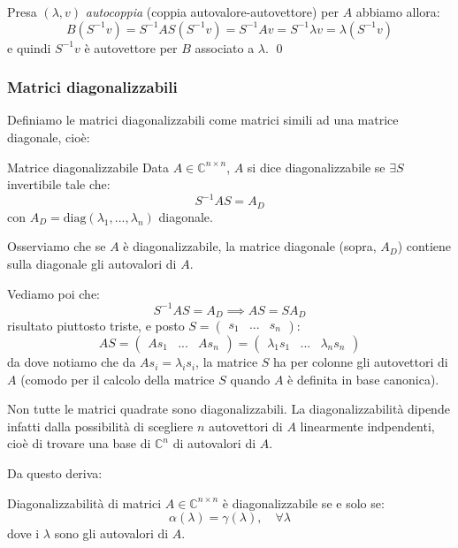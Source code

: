 \documentclass[a4paper,11pt]{article}
\begin{document}
Presa $(\lambda , v)$ \textit{autocoppia} (coppia autovalore-autovettore) per $A$ abbiamo allora:
$$
B(S^{-1} v) = S^{-1} A S (S^{-1} v) = S^{-1} A v = S^{-1} \lambda v = \lambda (S^{-1} v) 
$$
e quindi $S^{-1} v$ è autovettore per $B$ associato a $\lambda$. \qed

\subsubsection{Matrici diagonalizzabili}
Definiamo le matrici diagonalizzabili come matrici simili ad una matrice diagonale, cioè:
\begin{definition}{Matrice diagonalizzabile}
	Data $A \in \mathbb{C}^{n \times n}$, $A$ si dice diagonalizzabile se $\exists S$ invertibile tale che:
	$$
	S^{-1} A S = A_D
	$$
	con $A_D = \mathrm{diag} (\lambda_1, ..., \lambda_n)$ diagonale.
\end{definition}

Osserviamo che se $A$ è diagonalizzabile, la matrice diagonale (sopra, $A_D$) contiene sulla diagonale gli autovalori di $A$.

Vediamo poi che:
$$
S^{-1} A S = A_D \implies AS = S A_D
$$
risultato piuttosto triste, e posto $S = \begin{pmatrix}
	s_1 & ... & s_n
\end{pmatrix}$:
$$
AS = \begin{pmatrix}
	A s_1 & ... & A s_n
\end{pmatrix} = \begin{pmatrix}
	\lambda_1 s_1 & ... & \lambda_n s_n
\end{pmatrix}
$$
da dove notiamo che da $A s_i = \lambda_i s_i$, la matrice $S$ ha per colonne gli autovettori di $A$ (comodo per il calcolo della matrice $S$ quando $A$ è definita in base canonica).

\par\smallskip

Non tutte le matrici quadrate sono diagonalizzabili.
La diagonalizzabilità dipende infatti dalla possibilità di scegliere $n$ autovettori di $A$ linearmente indpendenti, cioè di trovare una base di $\mathbb{C}^n$ di autovalori di $A$.

Da questo deriva:
\begin{theorem}{Diagonalizzabilità di matrici}
	$A \in \mathbb{C}^{n \times n}$ è diagonalizzabile se e solo se:
	$$
		\alpha(\lambda) = \gamma(\lambda), \quad \forall \lambda
	$$
	dove i $\lambda$ sono gli autovalori di $A$.
\end{theorem}
\end{document}
